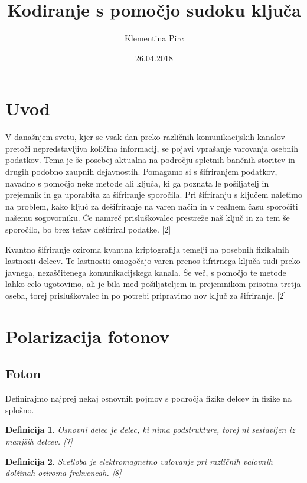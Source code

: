 \documentclass[A4paper, 11pt]{article}
\title{Kodiranje s pomočjo sudoku ključa}
\author{Klementina Pirc}
\date{26.04.2018}
\newtheorem{definicija}{Definicija}
\begin{document}
\maketitle



\section{Uvod}

V današnjem svetu, kjer se vsak dan preko različnih komunikacijskih kanalov pretoči nepredstavljiva količina informacij, se pojavi vprašanje varovanja osebnih podatkov. Tema je še posebej aktualna na področju spletnih bančnih storitev in drugih podobno zaupnih dejavnostih. Pomagamo si s šifriranjem podatkov, navadno s pomočjo neke metode ali ključa, ki ga poznata le pošiljatelj in prejemnik in ga uporabita za šifriranje sporočila. Pri šifriranju s ključem naletimo na problem, kako ključ za dešifriranje na varen način in v realnem času sporočiti našemu sogovorniku. Če namreč prisluškovalec prestreže naš ključ in za tem še sporočilo, bo brez težav dešifriral podatke. [2]

Kvantno šifriranje oziroma kvantna kriptografija temelji na posebnih fizikalnih lastnosti delcev. Te lastnostii omogočajo varen prenos šifrirnega ključa tudi preko javnega, nezaščitenega komunikacijskega kanala. Še več, s pomočjo te metode lahko celo ugotovimo, ali je bila med pošiljateljem in prejemnikom prisotna tretja oseba, torej prisluškovalec in po potrebi pripravimo nov ključ za šifriranje. [2]



\section{Polarizacija fotonov}

\subsection{Foton}

Definirajmo najprej nekaj osnovnih pojmov s področja fizike delcev in fizike na splošno.

\begin{definicija}
Osnovni delec je delec, ki nima podstrukture, torej ni sestavljen iz manjših delcev. [7]
\end{definicija}

\begin{definicija}
Svetloba je elektromagnetno valovanje pri različnih valovnih dolžinah oziroma frekvencah. [8]
\end{definicija}
\end{document}
